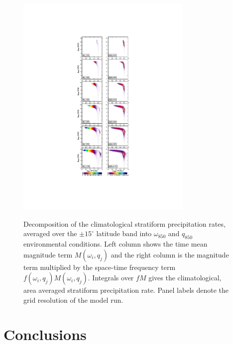 \documentclass[times]{qjrms4}
\begin{document}
\begin{figure}
\begin{center}
\noindent\includegraphics[width=20pc,angle=0]{figs/temp_pdecomp.pdf}\\
\end{center}
\caption{Decomposition of the climatological stratiform precipitation rates, averaged over the $\pm 15^{\circ}$ latitude band into $\omega_{850}$ and $q_{850}$ environmental conditions. Left column shows the time mean magnitude term $M\left( \omega_i , q_j \right)$ and the right column is the magnitude term multiplied by the space-time frequency term $f\left( \omega_i , q_j \right) M\left( \omega_i , q_j \right)$. Integrals over $f M$ gives the climatological, area averaged stratiform precipitation rate. Panel labels denote the grid resolution of the model run.}
\label{fig:pdecomp}
\end{figure}

\section{Conclusions}
\end{document}
